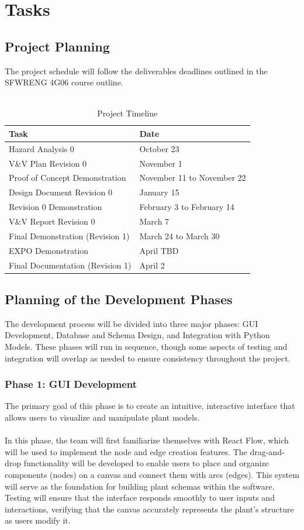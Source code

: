 \documentclass[12pt]{article}
\begin{document}
\section{Tasks}
\subsection{Project Planning}
The project schedule will follow the deliverables deadlines outlined in the SFWRENG 4G06 course outline.\\ \\
\begin{table}[hbt!]
  \centering
  \begin{tabularx}{\textwidth}{|X|l|}
    \hline
    \textbf{Task} & \textbf{Date} \\ \hline
    Hazard Analysis 0 & October 23 \\ \hline
    V\&V Plan Revision 0 & November 1 \\ \hline
    Proof of Concept Demonstration & November 11 to November 22 \\ \hline
    Design Document Revision 0 & January 15 \\ \hline
    Revision 0 Demonstration & February 3 to February 14 \\ \hline
    V\&V Report Revision 0 & March 7 \\ \hline
    Final Demonstration (Revision 1) & March 24 to March 30 \\ \hline
    EXPO Demonstration & April TBD \\ \hline
    Final Documentation (Revision 1) & April 2 \\ \hline
  \end{tabularx}
  \caption{Project Timeline}
  \end{table}
\subsection{Planning of the Development Phases}
The development process will be divided into three major phases: GUI Development, Database and Schema Design, and Integration with Python Models. These phases will run in sequence, though some aspects of testing and integration will overlap as needed to ensure consistency throughout the project.

\subsubsection{Phase 1: GUI Development}
The primary goal of this phase is to create an intuitive, interactive interface that allows users to visualize and manipulate plant models.\\\\
In this phase, the team will first familiarize themselves with React Flow, which will be used to implement the node and edge creation features. The drag-and-drop functionality will be developed to enable users to place and organize components (nodes) on a canvas and connect them with arcs (edges). This system will serve as the foundation for building plant schemas within the software. Testing will ensure that the interface responds smoothly to user inputs and interactions, verifying that the canvas accurately represents the plant’s structure as users modify it.
\end{document}
